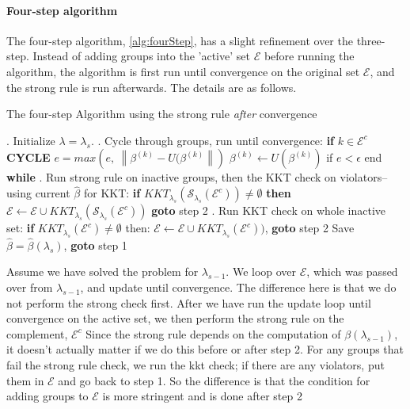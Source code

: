 \documentclass[12pt]{article}
\newcommand{\norm}[1]{\left\lVert #1 \right\rVert}
\begin{document}
\paragraph{Four-step algorithm}

The four-step algorithm, \autoref{alg:fourStep}, has a slight refinement over the three-step. Instead of adding groups into the 'active' set $\mathcal{E}$ before running the algorithm, the algorithm is first run until convergence on the original set $\mathcal{E}$, and the strong rule is run afterwards. The details are as follows.

\begin{algorithm}[tb!]
  \caption{The four-step Algorithm using the strong rule \textit{after} convergence} 
  \label{alg:fourStep}
  \begin{algorithmic}
	. Initialize $\lambda = \lambda_s$. 
    . Cycle through groups, run until convergence:
	\STATE \textbf{if} $k \in \mathcal{E}^c$ \textbf{CYCLE}
	\STATE $e = max(e,\ \norm{\beta^{(k)} - U(\beta^{(k)}})$
	\STATE	$\beta^{(k)} \leftarrow U(\beta^{(k)})$
	\ENDFOR
	\STATE if $e < \epsilon$ end \textbf{while}
	\ENDWHILE
	. Run strong rule on inactive groups, then the KKT check on violators--using current $\hat{\beta}$ for KKT:
	\STATE \textbf{if} $KKT_{\lambda_s}(\mathcal{S}_{\lambda_s}(\mathcal{E}^c)) \neq \emptyset$ \textbf{then}
	\STATE $\mathcal{E} \leftarrow \mathcal{E}\cup KKT_{\lambda_s}(\mathcal{S}_{\lambda_s}(\mathcal{E}^c))$
	\STATE \textbf{goto} step 2
	. Run KKT check on whole inactive set:
	\STATE \textbf{if} $KKT_{\lambda_s}(\mathcal{E}^c) \neq \emptyset$ then:
	\STATE $\mathcal{E} \leftarrow \mathcal{E}\cup KKT_{\lambda_s}(\mathcal{E}^c))$, \textbf{goto} step 2
	\STATE Save $\hat{\beta} = \hat{\beta}(\lambda_s)$, \textbf{goto} step 1
  \end{algorithmic}
\end{algorithm}



Assume we have solved the problem for $\lambda_{s-1}$. We loop over $\mathcal{E}$, which was passed over from $\lambda_{s-1}$, and update until convergence. The difference here is that we do not perform the strong check first. After we have run the update loop until convergence on the active set, we then perform the strong rule on the complement, $\mathcal{E}^c$ Since the strong rule depends on the computation of $\beta(\lambda_{s-1})$, it doesn't actually matter if we do this before or after step 2. For any groups that fail the strong rule check, we run the kkt check; if there are any violators, put them in $\mathcal{E}$ and go back to step 1. So the difference is that the condition for adding groups to $\mathcal{E}$ is more stringent and is done after step 2 
\end{document}
